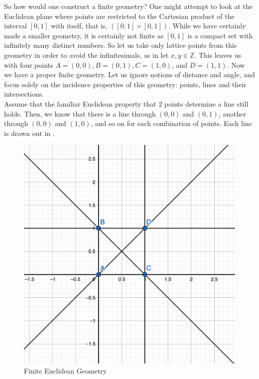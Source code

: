 \documentclass{article}
\begin{document}
So how would one construct a finite geometry? One might attempt to look at the Euclidean plane where points are restricted to the Cartesian product of the interval $[0,1]$ with itself, that is, $([0,1] \times [0,1])$. While we have certainly made a smaller geometry, it is certainly not finite as $[0,1]$ is a compact set with infinitely many distinct numbers. So let us take only lattice points from this geometry in order to avoid the infinitesimals, as in let $x,y \in \mathbb{Z}$. This leaves us with four points $A = (0,0), B = (0,1), C = (1,0)$, and $D=(1,1)$. Now we have a proper finite geometry. Let us ignore notions of distance and angle, and focus solely on the incidence properties of this geometry: points, lines and their intersections. \\ 

Assume that the familiar Euclidean property that 2 points determine a line still holds. Then, we know that there is a line through $(0,0)$ and $(0,1)$, another through $(0,0)$ and $(1,0)$, and so on for each combination of points. Each line is drawn out in .

\begin{figure}[h]
\centering
  \includegraphics[scale=.3]{final_paper_plot_1}
  \caption{Finite Euclidean Geometry}
  \label{fig:boat1}
\end{figure}
\end{document}
